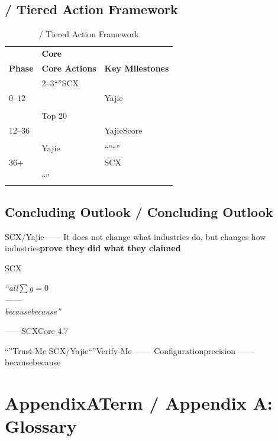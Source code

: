 \documentclass[12pt,a4paper]{article}
\theoremstyle{remark}
\newcommand{\sumgeq}{\sum g = 0}
\begin{document}
\subsection{ / Tiered Action Framework}

\begin{table}[H]
\centering
\caption{ / Tiered Action Framework}
\label{tab:action}
\begin{tabular}{@{}p{3cm}p{5cm}p{5.5cm}@{}}
\toprule
\textbf{} & \textbf{Core} & \textbf{} \\
\textbf{Phase} & \textbf{Core Actions} & \textbf{Key Milestones} \\
\midrule
\textbf{} & 2--3``''SCX &  \\
0--12 &  & Yajie \\
&  & \\
\midrule
\textbf{} & Top 20 &  \\
12--36 &  & YajieScore \\
&  & \\
\midrule
\textbf{} & Yajie & ``''``'' \\
36+ &  & SCX \\
& ``'' & \\
\bottomrule
\end{tabular}
\end{table}

\subsection{Concluding Outlook / Concluding Outlook}

SCX/Yajie——\textbf{}
It does not change what industries do, but changes how industries\textbf{prove they did what they claimed}

SCX
\begin{center}
\textit{``all$\sumgeq$}\\
\textit{——}\\
\textit{becausebecause''}
\end{center}

\vspace{1em}
\noindent ——SCXCore 4.7

``''Trust-Me
SCX/Yajie``''Verify-Me
——\textbf{}
Configurationprecision
——becausebecause

\appendix
\section{AppendixATerm / Appendix A: Glossary}
\end{document}
